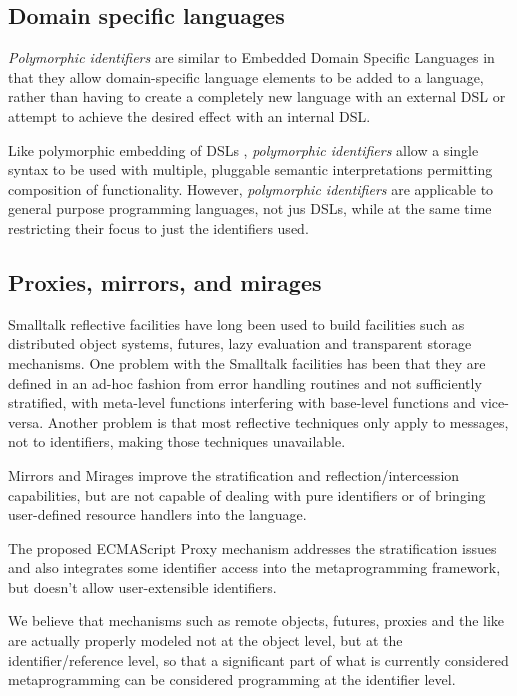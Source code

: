 \documentclass[preprint,authoryear]{acm_proc_article-sp}
\begin{document}
\subsection{Domain specific languages}

\emph{Polymorphic identifiers} are similar to Embedded Domain Specific Languages\cite{edsl}
in that they allow domain-specific language elements to be added to a language, rather
than having to create a completely new language with an external DSL or attempt to 
achieve the desired effect with an internal DSL\cite{fowlerdsl}.  

Like polymorphic embedding of DSLs \cite{polydsl}, \emph{polymorphic identifiers} allow
a single syntax to be used with multiple, pluggable semantic interpretations permitting
composition of functionality\cite{embeddeddsl}.  However, \emph{polymorphic identifiers}
are applicable to general purpose programming languages, not jus DSLs, while
at the same time restricting their focus to just the identifiers used.

\subsection{Proxies, mirrors, and mirages}

Smalltalk reflective facilities \cite{reflective-st} have long been used to build
facilities such as distributed object systems, futures, lazy evaluation and
transparent storage mechanisms.  One problem with the Smalltalk facilities
has been that they are defined in an ad-hoc fashion from error handling routines
and not sufficiently stratified, with meta-level functions
interfering with base-level functions and vice-versa.  Another problem is that
most reflective techniques only apply to messages, not to identifiers, making 
those techniques unavailable.

Mirrors \cite{mirrors} and Mirages \cite{mirages} improve the stratification and
reflection/intercession capabilities, but are not capable of dealing with pure
identifiers or of bringing user-defined resource handlers into the language.

The proposed ECMAScript Proxy mechanism \cite{VanCutsemMiller} addresses
the stratification issues and also integrates some identifier access into the 
metaprogramming framework, but doesn't allow user-extensible identifiers.

We believe that mechanisms such as remote objects, futures, proxies and the like
are actually properly modeled not at the object level, but at the identifier/reference
level, so that a significant part of what is currently considered metaprogramming
can be considered programming at the identifier level.
\end{document}
